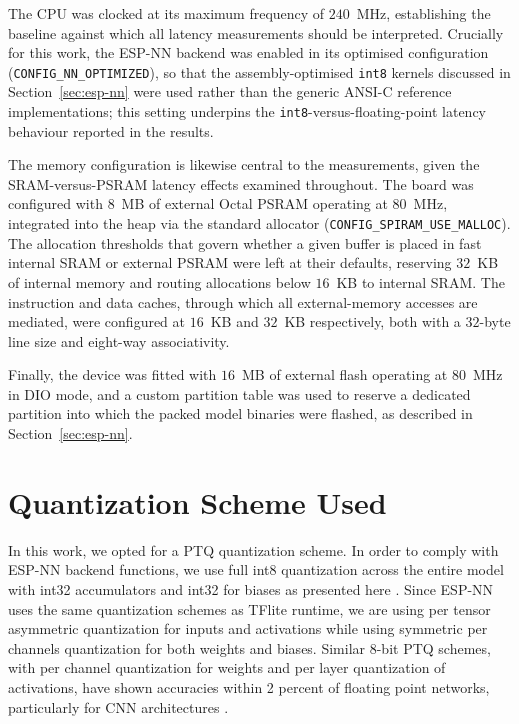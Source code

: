 \documentclass[12pt,DIV16,BCOR12mm,a4paper,footinclude=false,headinclude,parskip=half-,twoside,openright,cleardoublepage=empty,toc=index,bibliography=totoc,listof=totoc]{scrreprt}
\numberwithin{equation}{chapter}
\begin{document}
    The CPU was clocked at its maximum frequency of $240$~MHz, establishing the baseline
    against which all latency measurements should be interpreted. Crucially for this work,
    the ESP-NN backend was enabled in its optimised configuration
    (\texttt{CONFIG\_NN\_OPTIMIZED}), so that the assembly-optimised \texttt{int8} kernels
    discussed in Section~\ref{sec:esp-nn} were used rather than the generic ANSI-C reference
    implementations; this setting underpins the \texttt{int8}-versus-floating-point latency
    behaviour reported in the results.

    The memory configuration is likewise central to the measurements, given the
    SRAM-versus-PSRAM latency effects examined throughout. The board was configured with
    $8$~MB of external Octal PSRAM operating at $80$~MHz, integrated into the heap via the
    standard allocator (\texttt{CONFIG\_SPIRAM\_USE\_MALLOC}). The allocation thresholds
    that govern whether a given buffer is placed in fast internal SRAM or external PSRAM
    were left at their defaults, reserving $32$~KB of internal memory and routing
    allocations below $16$~KB to internal SRAM. The instruction and data caches, through
    which all external-memory accesses are mediated, were configured at $16$~KB and
    $32$~KB respectively, both with a $32$-byte line size and eight-way associativity.

    Finally, the device was fitted with $16$~MB of external flash operating at $80$~MHz in
    DIO mode, and a custom partition table was used to reserve a dedicated partition into
    which the packed model binaries were flashed, as described in
    Section~\ref{sec:esp-nn}.
  

  \section{Quantization Scheme Used}
  In this work, we opted for a PTQ quantization scheme. In order to comply with ESP-NN backend functions, we use full int8 quantization across the 
  entire model with int32 accumulators and int32 for biases as presented here \cite{jacobQuantizationTrainingNeural2017}. Since ESP-NN uses the same quantization schemes as TFlite runtime, 
  we are using per tensor asymmetric quantization for inputs and activations while using symmetric per channels quantization
  for both weights and biases. Similar 8-bit PTQ schemes, with per channel quantization for weights and per layer quantization of activations, have shown
  accuracies within 2 percent of floating point networks, particularly for CNN architectures \cite{krishnamoorthiQuantizingDeepConvolutional2018}. 
\end{document}
